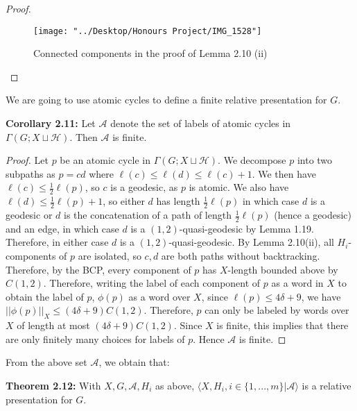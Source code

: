 \documentclass[12pt]{article}
\newcommand{\vs}{\vskip10pt}
\begin{document}
\begin{proof}
\begin{figure} [H]
	\centering
	\texttt{[image: "../Desktop/Honours Project/IMG\_1528"]}
	\caption{Connected components in the proof of Lemma 2.10 (ii)}
	\label{fig:img1528}
\end{figure}
		
	\end{proof}

	We are going to use atomic cycles to define a finite relative presentation for $G$. 
	
	\vs 
	
	\textbf{Corollary 2.11: } Let $\mathcal{A}$ denote the set of labels of atomic cycles in $\Gamma(G; X \sqcup \mathcal{H})$. Then $\mathcal{A}$ is finite. 
	
	\begin{proof}
		
		Let $p$ be an atomic cycle in $\Gamma(G; X \sqcup \mathcal{H})$. We decompose $p$ into two subpaths as $p = cd$ where $\ell(c) \leq \ell(d) \leq \ell(c) + 1$. We then have $\ell(c) \leq \frac{1}{2} \ell(p)$, so $c$ is a geodesic, as $p$ is atomic. We also have $\ell(d) \leq \frac{1}{2} \ell (p) + 1$, so either $d$ has length $\frac{1}{2} \ell (p)$ in which case $d$ is a geodesic or $d$ is the concatenation of a path of length $\frac{1}{2} \ell(p)$ (hence a geodesic) and an edge, in which case $d$ is a $(1,2)$-quasi-geodesic by Lemma 1.19. Therefore, in either case $d$ is a $(1,2)$-quasi-geodesic. By Lemma 2.10(ii), all $H_i$-components of $p$ are isolated, so $c,d$ are both paths without backtracking. Therefore, by the BCP, every component of $p$ has $X$-length bounded above by $C(1,2)$. Therefore, writing the label of each component of $p$ as a word in $X$ to obtain the label of $p$, $\phi(p)$ as a word over $X$, since $\ell(p) \leq 4 \delta + 9$, we have $\vert \vert \phi(p) \vert \vert_X \leq (4 \delta + 9) C(1,2)$. Therefore, $p$ can only be labeled by words over $X$ of length at most $(4 \delta + 9) C(1,2)$. Since $X$ is finite, this implies that there are only finitely many choices for labels of $p$. Hence $\mathcal{A}$ is finite. 
	\end{proof}

	From the above set $\mathcal{A}$, we obtain that: 
	
	\vs 
	
	\textbf{Theorem 2.12: } With $X, G, \mathcal{A}, H_i$ as above, $\langle X, H_i, i \in \{1,...,m\} \vert \mathcal{A} \rangle$ is a relative presentation for $G$. 
	
	\vs 
	
\end{document}
